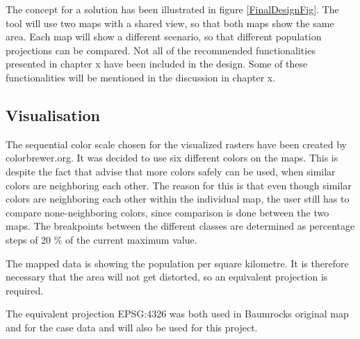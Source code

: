 The concept for a solution has been illustrated in figure \ref{FinalDesignFig}. The tool will use two maps with a shared view, so that both maps show the same area. Each map will show a different scenario, so that different population projections can be compared. Not all of the recommended functionalities presented in chapter x have been included in the design. Some of these functionalities will be mentioned in the discussion in chapter x.


\subsection{Visualisation}
The sequential color scale chosen for the visualized rasters have been created by colorbrewer.org. It was decided to use six different colors on the maps. This is despite the fact that \citet{ColorBrewerwebsite} advise that more colors safely can be used, when similar colors are neighboring each other. The reason for this is that even though similar colors are neighboring each other within the individual map, the user still has to compare none-neighboring colors, since comparison is done between the two maps. 
The breakpoints between the different classes are determined as percentage steps of 20 \% of the current maximum value. 

The mapped data is showing the population per square kilometre. It is therefore necessary that the area will not get distorted, so an equivalent projection is required. 

The equivalent projection EPSG:4326 was both used in Baumrocks original map and for the case data and will also be used for this project. 
